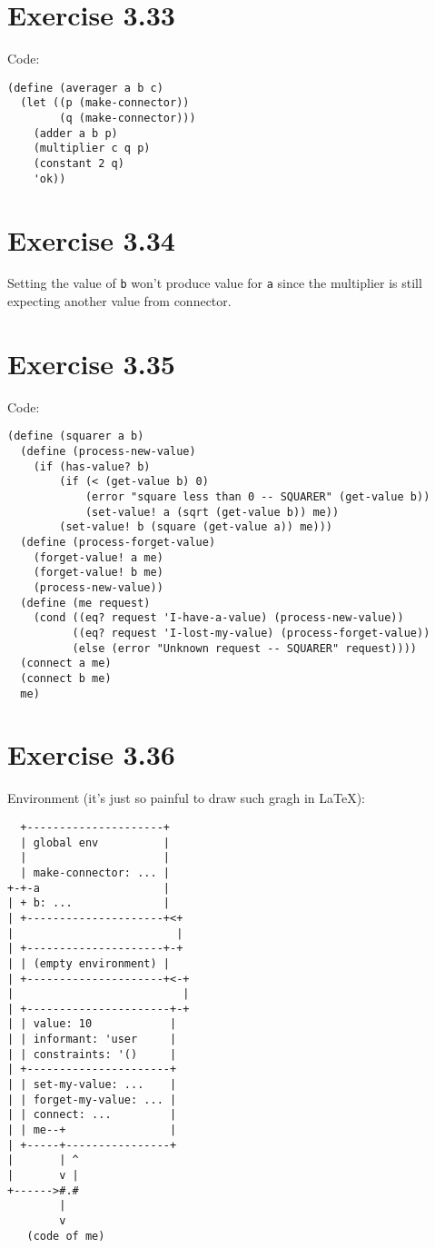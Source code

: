 \documentclass[../main.tex]{subfiles}
\begin{document}
\section{Exercise 3.33}

Code:

\begin{lstlisting}
(define (averager a b c)
  (let ((p (make-connector))
        (q (make-connector)))
    (adder a b p)
    (multiplier c q p)
    (constant 2 q)
    'ok))
\end{lstlisting}

\section{Exercise 3.34}

Setting the value of \lstinline{b} won't
produce value for \lstinline{a} since the multiplier
is still expecting another value from connector.

\section{Exercise 3.35}

Code:

\begin{lstlisting}
(define (squarer a b)
  (define (process-new-value)
    (if (has-value? b)
        (if (< (get-value b) 0)
            (error "square less than 0 -- SQUARER" (get-value b))
            (set-value! a (sqrt (get-value b)) me))
        (set-value! b (square (get-value a)) me)))
  (define (process-forget-value)
    (forget-value! a me)
    (forget-value! b me)
    (process-new-value))
  (define (me request)
    (cond ((eq? request 'I-have-a-value) (process-new-value))
          ((eq? request 'I-lost-my-value) (process-forget-value))
          (else (error "Unknown request -- SQUARER" request))))
  (connect a me)
  (connect b me)
  me)
\end{lstlisting}

\section{Exercise 3.36}

Environment (it's just so painful to draw such gragh in \LaTeX):

\begin{lstlisting}
  +---------------------+
  | global env          |
  |                     |
  | make-connector: ... |
+-+-a                   |
| + b: ...              |
| +---------------------+<+
|                         |
| +---------------------+-+
| | (empty environment) |
| +---------------------+<-+
|                          |
| +----------------------+-+
| | value: 10            |
| | informant: 'user     |
| | constraints: '()     |
| +----------------------+
| | set-my-value: ...    |
| | forget-my-value: ... |
| | connect: ...         |
| | me--+                |
| +-----+----------------+
|       | ^
|       v |
+------>#.#
        |
        v
   (code of me)
\end{lstlisting}
\end{document}
